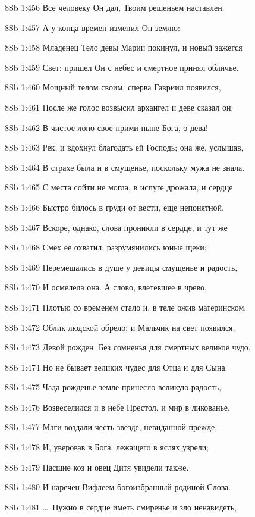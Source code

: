 \vs 8Sb 1:456 Все человеку Он дал, Твоим решеньем наставлен.

\vs 8Sb 1:457 А у конца времен изменил Он землю: 

\vs 8Sb 1:458 Младенец Тело девы Марии покинул, и новый зажегся 

\vs 8Sb 1:459 Свет: пришел Он с небес и смертное принял обличье. 

\vs 8Sb 1:460 Мощный телом своим, сперва Гавриил появился,

\vs 8Sb 1:461 После же голос возвысил архангел и деве сказал он: 

\vs 8Sb 1:462 В чистое лоно свое прими ныне Бога, о дева! 

\vs 8Sb 1:463 Рек, и вдохнул благодать ей Господь; она же, услышав, 

\vs 8Sb 1:464 В страхе была и в смущенье, поскольку мужа не знала. 

\vs 8Sb 1:465 С места сойти не могла, в испуге дрожала, и сердце

\vs 8Sb 1:466 Быстро билось в груди от вести, еще непонятной. 

\vs 8Sb 1:467 Вскоре, однако, слова проникли в сердце, и тут же 

\vs 8Sb 1:468 Смех ее охватил, разрумянились юные щеки; 

\vs 8Sb 1:469 Перемешались в душе у девицы смущенье и радость, 

\vs 8Sb 1:470 И осмелела она. А слово, влетевшее в чрево,

\vs 8Sb 1:471 Плотью со временем стало и, в теле ожив материнском, 

\vs 8Sb 1:472 Облик людской обрело; и Мальчик на свет появился, 

\vs 8Sb 1:473 Девой рожден. Без сомненья  для смертных великое чудо, 

\vs 8Sb 1:474 Но не бывает великих чудес для Отца и для Сына. 

\vs 8Sb 1:475 Чада рожденье земле принесло великую радость,

\vs 8Sb 1:476 Возвеселился и в небе Престол, и мир  в ликованье. 

\vs 8Sb 1:477 Маги воздали честь звезде, невиданной прежде, 

\vs 8Sb 1:478 И, уверовав в Бога, лежащего в яслях узрели; 

\vs 8Sb 1:479 Пасшие коз и овец Дитя увидели также. 

\vs 8Sb 1:480 И наречен Вифлеем богоизбранный родиной Слова.

\vs 8Sb 1:481 \ldots\ Нужно в сердце иметь смиренье и зло ненавидеть, 

